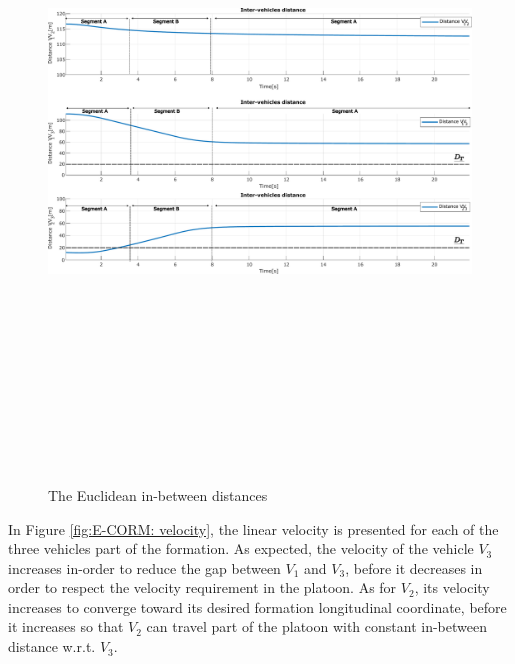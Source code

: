         \begin{figure}[!h]
        \centering 
        \includegraphics[width=12cm,height=18cm,keepaspectratio]{chapters/Chapitre_5/Figures/E-CORM/Distances.pdf}
        \caption{The Euclidean in-between distances}
        \label{fig:E-CORM: formation_distances}
        \end{figure}



In Figure \ref{fig:E-CORM: velocity}, the linear velocity is presented for each of the three vehicles part of the formation. As expected, the velocity of the vehicle $V_3$ increases in-order to reduce the gap between $V_1$ and $V_3$, before it decreases in order to respect the velocity requirement in the platoon. As for $V_2$, its velocity increases to converge toward its desired formation longitudinal coordinate, before it increases so that $V_2$ can travel part of the platoon with constant in-between distance w.r.t. $V_3$. 

